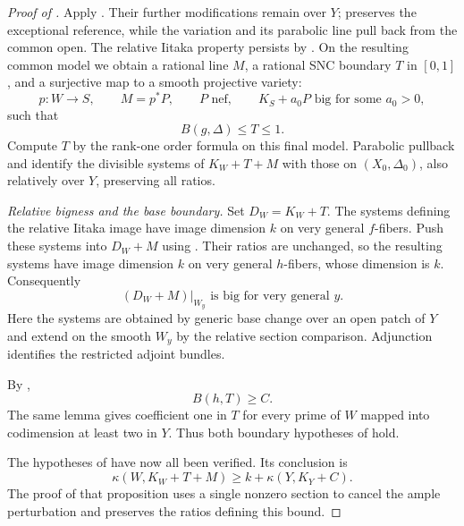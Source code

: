 \begin{proof}[Proof of ]
Apply . Their further
modifications remain over \(Y\);  preserves
the exceptional reference, while the variation and its parabolic line
pull back from the common open. The relative Iitaka property persists
by . On the resulting common model
we obtain a rational line \(M\), a rational SNC boundary \(T\) in
\([0,1]\), and a surjective map to a smooth projective variety:
\begin{equation}
 p:W\longrightarrow S,
 \qquad M=p^*P,
 \qquad P\text{ nef},
 \qquad K_S+a_0P\text{ big for some }a_0>0,
 \label{application:period-data}
\end{equation}
such that
\begin{equation}
 B(g,\Delta)\leq T\leq1.
 \label{application:rankone-boundary}
\end{equation}
Compute \(T\) by the rank-one order formula on this final model.
Parabolic pullback and  identify the divisible
systems of \(K_W+T+M\) with those on \((X_0,\Delta_0)\), also
relatively over \(Y\), preserving all ratios.

\smallskip\noindent
\emph{Relative bigness and the base boundary.}
Set \(D_W=K_W+T\).  The systems defining the relative Iitaka image
have image dimension \(k\) on very general \(f\)-fibers. Push these systems
into \(D_W+M\) using .  Their ratios are
unchanged, so the resulting systems have image dimension \(k\) on
very general \(h\)-fibers, whose dimension is \(k\).  Consequently
\begin{equation}
 (D_W+M)|_{W_y}\text{ is big for very general }y.
 \label{application:relative-big}
\end{equation}
Here the systems are obtained by generic base change over an open patch
of \(Y\) and extend on the smooth \(W_y\) by the relative section
comparison. Adjunction identifies the restricted adjoint bundles.

By ,
\begin{equation}
 B(h,T)\geq C.
 \label{application:composed-boundary}
\end{equation}
The same lemma gives coefficient one in \(T\) for every prime of
\(W\) mapped into codimension at least two in \(Y\). Thus both
boundary hypotheses of  hold.

The hypotheses of  have now all been
verified. Its conclusion is
\begin{equation}\label{application:final-intermediate-bound}
 \kappa(W,K_W+T+M)\geq k+\kappa(Y,K_Y+C).
\end{equation}
The proof of that proposition uses a single nonzero section to cancel
the ample perturbation and preserves the ratios defining this bound.


\end{proof}
